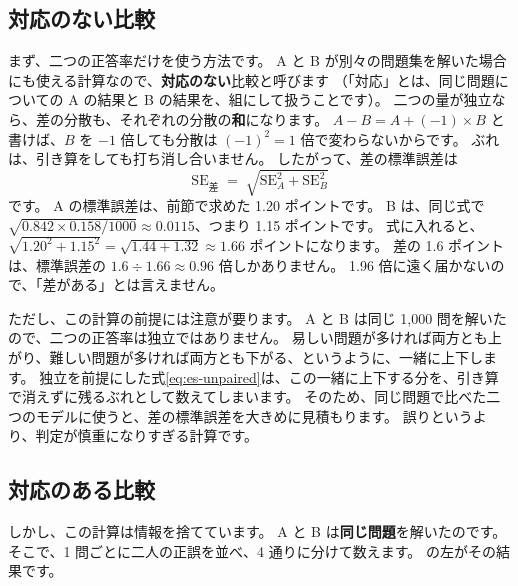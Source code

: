 \subsection*{対応のない比較}

まず、二つの正答率だけを使う方法です。
A と B が別々の問題集を解いた場合にも使える計算なので、\textbf{対応のない}比較と呼びます
（「対応」とは、同じ問題についての A の結果と B の結果を、組にして扱うことです）。
二つの量が独立なら、差の分散も、それぞれの分散の\textbf{和}になります。
$A-B=A+(-1)\times B$ と書けば、$B$ を $-1$ 倍しても分散は $(-1)^2=1$ 倍で変わらないからです。
ぶれは、引き算をしても打ち消し合いません。
したがって、差の標準誤差は
\begin{equation}
\mathrm{SE}_{\text{差}} \;=\; \sqrt{\mathrm{SE}_A^2+\mathrm{SE}_B^2}
\label{eq:es-unpaired}
\end{equation}
です。
A の標準誤差は、前節で求めた 1.20 ポイントです。
B は、同じ式で $\sqrt{0.842\times0.158/1000}\approx0.0115$、つまり 1.15 ポイントです。
式に入れると、$\sqrt{1.20^2+1.15^2}=\sqrt{1.44+1.32}\approx1.66$ ポイントになります。
差の 1.6 ポイントは、標準誤差の $1.6\div1.66\approx0.96$ 倍しかありません。
1.96 倍に遠く届かないので、「差がある」とは言えません。

ただし、この計算の前提には注意が要ります。
A と B は同じ 1,000 問を解いたので、二つの正答率は独立ではありません。
易しい問題が多ければ両方とも上がり、難しい問題が多ければ両方とも下がる、というように、一緒に上下します。
独立を前提にした式\eqref{eq:es-unpaired}は、この一緒に上下する分を、引き算で消えずに残るぶれとして数えてしまいます。
そのため、同じ問題で比べた二つのモデルに使うと、差の標準誤差を大きめに見積もります。
誤りというより、判定が慎重になりすぎる計算です。

\subsection*{対応のある比較}

しかし、この計算は情報を捨てています。
A と B は\textbf{同じ問題}を解いたのです。
そこで、1 問ごとに二人の正誤を並べ、4 通りに分けて数えます。
の左がその結果です。


